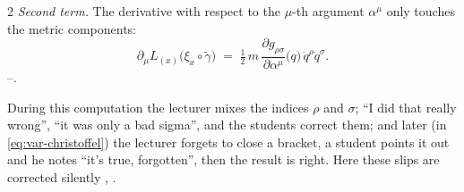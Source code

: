\begin{paracol}{2}
\emph{Second term.} The derivative with respect to the $\mu$-th argument $\alpha^\mu$ only touches the metric components:
\begin{equation}\label{eq:var-term2}
  \partial_\mu L_{(x)}\bigl(\xi_x\circ\tilde\gamma\bigr)\;=\;\tfrac12\,m\,\frac{\partial g_{\rho\sigma}}{\partial\alpha^\mu}\bigl(q\bigr)\,\dot q^\rho\dot q^\sigma .
\end{equation}
--.

\begin{coursenote}\label{cn:var-slips}
During this computation the lecturer mixes the indices $\rho$ and $\sigma$; ``I did that really wrong'', ``it was only a bad sigma'', and the students correct them; and later (in \eqref{eq:var-christoffel}) the lecturer forgets to close a bracket, a student points it out and he notes ``it's true, forgotten'', then the result is right. Here these slips are corrected silently , .
\end{coursenote}


\end{paracol}

